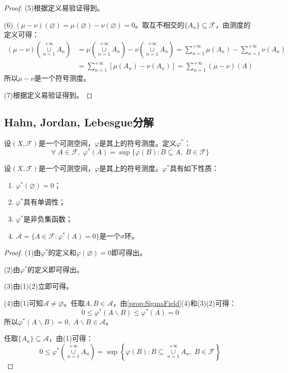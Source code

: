 \begin{proof}
	(5)根据定义易验证得到。\par
	(6)$\;(\mu-\nu)(\varnothing)=\mu(\varnothing)-\nu(\varnothing)=0$。取互不相交的$\{A_n\}\subseteq\mathscr{F}$，由测度的定义可得：
	\begin{align*}
		(\mu-\nu)\left(\underset{n=1}{\overset{+\infty}{\cup}}A_n\right)&=\mu\left(\underset{n=1}{\overset{+\infty}{\cup}}A_n\right)-\nu\left(\underset{n=1}{\overset{+\infty}{\cup}}A_n\right)=\sum_{n=1}^{+\infty}\mu(A_n)-\sum_{n=1}^{+\infty}\nu(A_n) \\
		&=\sum_{n=1}^{+\infty}[\mu(A_n)-\nu(A_n)]=\sum_{n=1}^{+\infty}(\mu-\nu)(A)
	\end{align*}
	所以$\mu-\nu$是一个符号测度。\par
	(7)根据定义易验证得到。
\end{proof}
\subsection{Hahn, Jordan, Lebesgue分解}
\begin{definition}
	 设$(X,\mathscr{F})$是一个可测空间，$\varphi$是其上的符号测度。定义$\varphi^*$：
	\begin{equation*}
		\forall\;A\in\mathscr{F},\;\varphi^*(A)=\sup\{\varphi(B):B\subseteq A,\;B\in\mathscr{F}\}
	\end{equation*}
\end{definition}
\begin{property}\label{prop:varphi*}
	设$(X,\mathscr{F})$是一个可测空间，$\varphi$是其上的符号测度。$\varphi^*$具有如下性质：
	\begin{enumerate}
		\item $\varphi^*(\varnothing)=0$；
		\item $\varphi^*$具有单调性；
		\item $\varphi^*$是非负集函数；
		\item $\mathscr{A}=\{A\in\mathscr{F}:\varphi^*(A)=0\}$是一个$\sigma$环。
	\end{enumerate}
\end{property}
\begin{proof}
	(1)由$\varphi^*$的定义和$\varphi(\varnothing)=0$即可得出。\par
	(2)由$\varphi^* $的定义即可得出。\par
	(3)由(1)(2)立即可得。\par
	(4)由(1)可知$\mathscr{A}\ne\varnothing$。任取$A,B\in\mathscr{A}$，由\cref{prop:SigmaField}(4)和(3)(2)可得：
	\begin{equation*}
		0\leqslant\varphi^*(A\backslash B)\leqslant\varphi^*(A)=0
	\end{equation*}
	所以$\varphi^*(A\backslash B)=0,\;A\backslash B\in\mathscr{A}$。\par
	任取$\{A_n\}\subseteq\mathscr{A}$，由(1)可得：
	\begin{equation*}
		0\leqslant\varphi^*\left(\underset{n=1}{\overset{+\infty}{\cup}}A_n\right)=\sup\left\{\varphi(B):B\subseteq\underset{n=1}{\overset{+\infty}{\cup}}A_n,\;B\in\mathscr{F}\right\}
	\end{equation*}
\end{proof}
